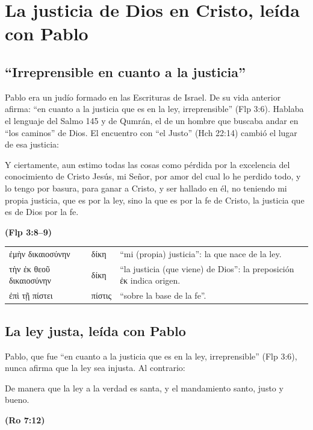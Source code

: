 \documentclass[11pt,letterpaper]{article}
\newcommand{\grc}[1]{\foreignlanguage{ancientgreek}{#1}}
\newcommand{\fuente}[1]{\par\hfill{\upshape\bfseries\small\textcolor{azul}{#1}}}
\begin{document}
\section{La justicia de Dios en Cristo, leída con Pablo}\label{sec:cristo-justo}

\subsection{``Irreprensible en cuanto a la justicia''}
Pablo era un judío formado en las Escrituras de Israel. De su vida anterior afirma: ``en cuanto a la justicia que es en la ley, irreprensible'' (Flp 3:6). Hablaba el lenguaje del Salmo 145 y de Qumrán, el de un hombre que buscaba andar en ``los caminos'' de Dios. El encuentro con ``el Justo'' (Hch 22:14) cambió el lugar de esa justicia:

\begin{cita}Y ciertamente, aun estimo todas las cosas como pérdida por la excelencia del conocimiento de Cristo Jesús, mi Señor, por amor del cual lo he perdido todo, y lo tengo por basura, para ganar a Cristo, y ser hallado en él, no teniendo mi propia justicia, que es por la ley, sino la que es por la fe de Cristo, la justicia que es de Dios por la fe.\fuente{(Flp 3:8--9)}\end{cita}

\begin{filologia}[Flp 3:9]
\begin{tabular}{@{}L{3.2cm}L{1.6cm}L{10cm}@{}}
\grc{ἐμὴν δικαιοσύνην} & \grc{δίκη} & ``mi (propia) justicia'': la que nace de la ley. \\[2pt]
\grc{τὴν ἐκ θεοῦ δικαιοσύνην} & \grc{δίκη} & ``la justicia (que viene) de Dios'': la preposición \grc{ἐκ} indica origen. \\[2pt]
\grc{ἐπὶ τῇ πίστει} & \grc{πίστις} & ``sobre la base de la fe''. \\
\end{tabular}
\end{filologia}

\subsection{La ley justa, leída con Pablo}
Pablo, que fue ``en cuanto a la justicia que es en la ley, irreprensible'' (Flp 3:6), nunca afirma que la ley sea injusta. Al contrario:

\begin{cita}De manera que la ley a la verdad es santa, y el mandamiento santo, justo y bueno.\fuente{(Ro 7:12)}\end{cita}
\end{document}
